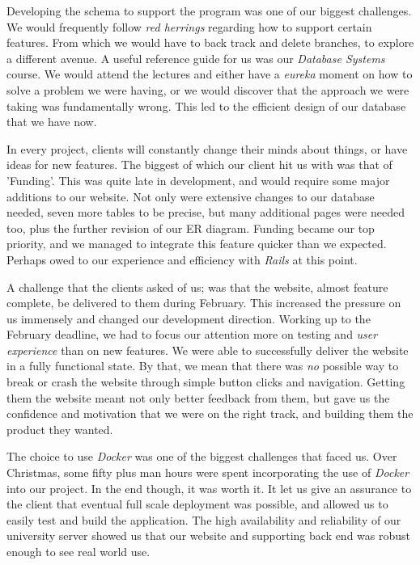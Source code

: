 \documentclass{l3proj}
\begin{document}
Developing the schema to support the program was one of our biggest challenges. We would frequently follow \textit{red herrings} regarding how to support certain features. From which we would have to back track and delete branches, to explore a different avenue. A useful reference guide for us was our \textit{Database Systems} course. We would attend the lectures and either have a \textit{eureka} moment on how to solve a problem we were having, or we would discover that the approach we were taking was fundamentally wrong. This led to the efficient design of our database that we have now.

In every project, clients will constantly change their minds about things, or have ideas for new features. The biggest of which our client hit us with was that of 'Funding'. This was quite late in development, and would require some major additions to our website. Not only were extensive changes to our database needed, seven more tables to be precise, but many additional pages were needed too, plus the further revision of our ER diagram. Funding became our top priority, and we managed to integrate this feature quicker than we expected. Perhaps owed to our experience and efficiency with \textit{Rails} at this point.

A challenge that the clients asked of us; was that the website, almost feature complete, be delivered to them during February. This increased the pressure on us immensely and changed our development direction. Working up to the February deadline, we had to focus our attention more on testing and \textit{user experience} than on new features. We were able to successfully deliver the website in a fully functional state. By that, we mean that there was \textit{no} possible way to break or crash the website through simple button clicks and navigation. Getting them the website meant not only better feedback from them, but gave us the confidence and motivation that we were on the right track, and building them the product they wanted.

The choice to use \textit{Docker} was one of the biggest challenges that faced us. Over Christmas, some fifty plus man hours were spent incorporating the use of \textit{Docker} into our project. In the end though, it was worth it. It let us give an assurance to the client that eventual full scale deployment was possible, and allowed us to easily test and build the application. The high availability and reliability of our university server showed us that our website and supporting back end was robust enough to see real world use.
\end{document}
